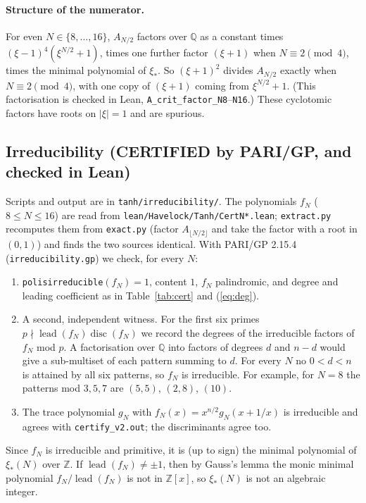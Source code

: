 \documentclass[11pt]{article}
\theoremstyle{remark}
\begin{document}
\paragraph{Structure of the numerator.} For even $N\in\{8,\dots,16\}$, $A_{N/2}$ factors over $\mathbb Q$ as
a constant times $(\xi-1)^4(\xi^{N/2}+1)$, times one further factor $(\xi+1)$ when $N\equiv2\pmod4$, times the minimal polynomial of $\xi_*$. So $(\xi+1)^2$ divides $A_{N/2}$ exactly when $N\equiv2\pmod4$, with one copy of $(\xi+1)$ coming from $\xi^{N/2}+1$. (This factorisation is checked in Lean, \texttt{A\_crit\_factor\_N8}--\texttt{N16}.) These cyclotomic factors have roots on $|\xi|=1$ and are spurious.

\subsection{Irreducibility (CERTIFIED by PARI/GP, and checked in Lean)}\label{sec:irred}
Scripts and output are in \texttt{tanh/irreducibility/}. The polynomials $f_N$ ($8\le N\le16$) are read from
\texttt{lean/Havelock/Tanh/CertN*.lean}; \texttt{extract.py} recomputes them from \texttt{exact.py} (factor
$A_{\lfloor N/2\rfloor}$ and take the factor with a root in $(0,1)$) and finds the two sources identical. With PARI/GP 2.15.4
(\texttt{irreducibility.gp}) we check, for every $N$:
\begin{enumerate}
\item \texttt{polisirreducible}$(f_N)=1$, content $1$, $f_N$ palindromic, and degree and leading coefficient as in
Table~\ref{tab:cert} and (\ref{eq:deg}).
\item A second, independent witness. For the first six primes $p\nmid\operatorname{lead}(f_N)\operatorname{disc}(f_N)$
we record the degrees of the irreducible factors of $f_N$ mod $p$. A factorisation over $\mathbb Q$ into factors of
degrees $d$ and $n-d$ would give a sub-multiset of each pattern summing to $d$. For every $N$ no $0<d<n$ is attained by
all six patterns, so $f_N$ is irreducible. For example, for $N=8$ the patterns mod $3,5,7$ are $(5,5)$, $(2,8)$, $(10)$.
\item The trace polynomial $g_N$ with $f_N(x)=x^{n/2}g_N(x+1/x)$ is irreducible and agrees with \texttt{certify\_v2.out};
the discriminants agree too.
\end{enumerate}
Since $f_N$ is irreducible and primitive, it is (up to sign) the minimal polynomial of $\xi_*(N)$ over $\mathbb Z$. If
$\operatorname{lead}(f_N)\ne\pm1$, then by Gauss's lemma the monic minimal polynomial $f_N/\operatorname{lead}(f_N)$ is not
in $\mathbb Z[x]$, so $\xi_*(N)$ is not an algebraic integer.
\end{document}
